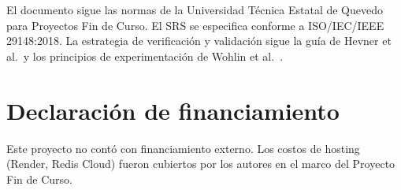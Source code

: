 El documento sigue las normas de la Universidad Técnica Estatal de Quevedo para Proyectos Fin de Curso. El SRS se especifica conforme a ISO/IEC/IEEE 29148:2018. La estrategia de verificación y validación sigue la guía de Hevner et al.~y los principios de experimentación de Wohlin et al.~\cite{wohlin2012}.

\section*{Declaración de financiamiento}

Este proyecto no contó con financiamiento externo. Los costos de hosting (Render, Redis Cloud) fueron cubiertos por los autores en el marco del Proyecto Fin de Curso.
